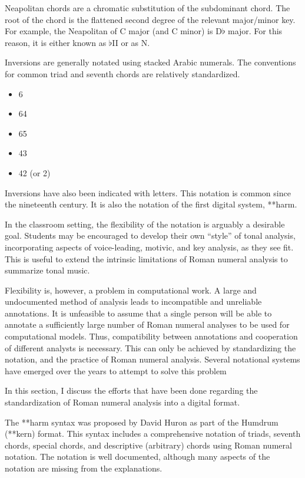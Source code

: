 Neapolitan chords are a chromatic substitution of the
subdominant chord. The root of the chord is the flattened
second degree of the relevant major/minor key. For example,
the Neapolitan of C major (and C minor) is D$\flat$ major.
For this reason, it is either known as $\flat$II or as N.

Inversions are generally notated using stacked Arabic
numerals. The conventions for common triad and seventh
chords are relatively standardized.

\begin{itemize}
    \item 6
    \item 64
    \item 65
    \item 43
    \item 42 (or 2)
\end{itemize}

Inversions have also been indicated with letters. This
notation is common since the nineteenth century. It is also
the notation of the first digital system, **harm.

In the classroom setting, the flexibility of the notation is
arguably a desirable goal. Students may be encouraged to
develop their own ``style'' of tonal analysis, incorporating
aspects of voice-leading, motivic, and key analysis, as they
see fit. This is useful to extend the intrinsic limitations
of Roman numeral analysis to summarize tonal music.

Flexibility is, however, a problem in computational work. A
large and undocumented method of analysis leads to
incompatible and unreliable annotations. It is unfeasible to
assume that a single person will be able to annotate a
sufficiently large number of Roman numeral analyses to be
used for computational models. Thus, compatibility between
annotations and cooperation of different analysts is
necessary. This can only be achieved by standardizing the
notation, and the practice of Roman numeral analysis.
Several notational systems have emerged over the years to
attempt to solve this problem

In this section, I discuss the efforts that have been done
regarding the standardization of Roman numeral analysis into
a digital format.

The **harm syntax was proposed by David Huron as part of the
Humdrum (**kern) format. This syntax includes a
comprehensive notation of triads, seventh chords, special
chords, and descriptive (arbitrary) chords using Roman
numeral notation. The notation is well documented, although
many aspects of the notation are missing from the
explanations.

